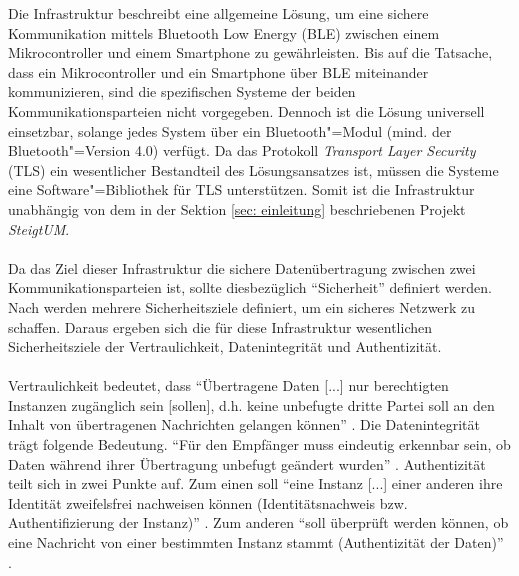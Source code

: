Die Infrastruktur beschreibt eine allgemeine Lösung, um eine sichere Kommunikation mittels Bluetooth Low Energy (BLE) zwischen einem Mikrocontroller und einem Smartphone zu gewährleisten. Bis auf die Tatsache, dass ein Mikrocontroller und ein Smartphone über BLE miteinander kommunizieren, sind die spezifischen Systeme der beiden Kommunikationsparteien nicht vorgegeben. Dennoch ist die Lösung universell einsetzbar, solange jedes System über ein Bluetooth"=Modul (mind. der Bluetooth"=Version 4.0) verfügt. Da das Protokoll \textit{Transport Layer Security} (TLS) ein wesentlicher Bestandteil des Lösungsansatzes ist, müssen die Systeme eine Software"=Bibliothek für TLS unterstützen. Somit ist die Infrastruktur unabhängig von dem in der Sektion \ref{sec: einleitung} beschriebenen Projekt \textit{SteigtUM}.
\\\\
Da das Ziel dieser Infrastruktur die sichere Datenübertragung zwischen zwei Kommunikationsparteien ist, sollte diesbezüglich "`Sicherheit"' definiert werden. Nach \cite{Bless2005_19-20} werden mehrere Sicherheitsziele definiert, um ein sicheres Netzwerk zu schaffen. Daraus ergeben sich die für diese Infrastruktur wesentlichen Sicherheitsziele der Vertraulichkeit, Datenintegrität und Authentizität.
\\\\
Vertraulichkeit bedeutet, dass "`Übertragene Daten [...] nur berechtigten Instanzen zugänglich sein [sollen], d.h. keine unbefugte dritte Partei soll an den Inhalt von übertragenen Nachrichten gelangen können"' \cite{Bless2005_19}.
Die Datenintegrität trägt folgende Bedeutung. "`Für den Empfänger muss eindeutig erkennbar sein, ob Daten während ihrer Übertragung unbefugt geändert wurden"' \cite{Bless2005_19}.
Authentizität teilt sich in zwei Punkte auf. Zum einen soll "`eine Instanz [...] einer anderen ihre Identität zweifelsfrei nachweisen können (Identitätsnachweis bzw. Authentifizierung der Instanz)"' \cite{Bless2005_19}. 
Zum anderen "`soll überprüft werden können, ob eine Nachricht von einer bestimmten Instanz stammt (Authentizität der Daten)"' \cite{Bless2005_19}.
